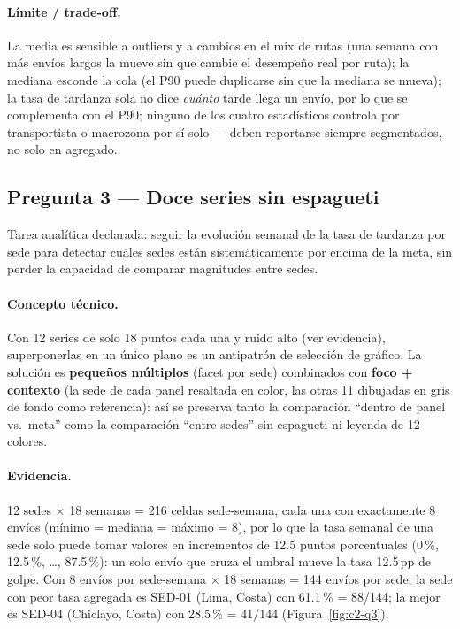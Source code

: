 \paragraph{Límite / trade-off.} La media es sensible a outliers y a cambios en el mix de rutas (una semana con más envíos largos la mueve sin que cambie el desempeño real por ruta); la mediana esconde la cola (el P90 puede duplicarse sin que la mediana se mueva); la tasa de tardanza sola no dice \emph{cuánto} tarde llega un envío, por lo que se complementa con el P90; ninguno de los cuatro estadísticos controla por transportista o macrozona por sí solo --- deben reportarse siempre segmentados, no solo en agregado.

\subsection{Pregunta 3 --- Doce series sin espagueti}\label{ssec:c2-q3}

Tarea analítica declarada: seguir la evolución semanal de la tasa de tardanza por sede para detectar cuáles sedes están sistemáticamente por encima de la meta, sin perder la capacidad de comparar magnitudes entre sedes.

\paragraph{Concepto técnico.} Con 12 series de solo 18 puntos cada una y ruido alto (ver evidencia), superponerlas en un único plano es un antipatrón de selección de gráfico. La solución es \textbf{pequeños múltiplos} (facet por sede) combinados con \textbf{foco + contexto} (la sede de cada panel resaltada en color, las otras 11 dibujadas en gris de fondo como referencia): así se preserva tanto la comparación ``dentro de panel vs.\ meta'' como la comparación ``entre sedes'' sin espagueti ni leyenda de 12 colores.

\paragraph{Evidencia.} 12 sedes $\times$ 18 semanas = 216 celdas sede-semana, cada una con exactamente 8 envíos (mínimo = mediana = máximo = 8), por lo que la tasa semanal de una sede solo puede tomar valores en incrementos de 12.5 puntos porcentuales (0\,\%, 12.5\,\%, \ldots, 87.5\,\%): un solo envío que cruza el umbral mueve la tasa 12.5\,pp de golpe. Con 8 envíos por sede-semana $\times$ 18 semanas = 144 envíos por sede, la sede con peor tasa agregada es SED-01 (Lima, Costa) con 61.1\,\% = 88/144; la mejor es SED-04 (Chiclayo, Costa) con 28.5\,\% = 41/144 (Figura~\ref{fig:c2-q3}).

